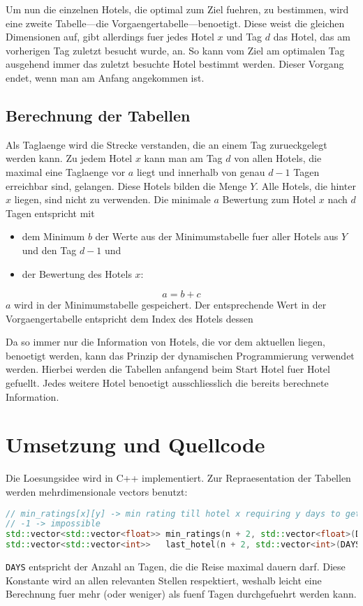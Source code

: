\documentclass[a4paper,10pt,ngerman]{scrartcl}
\begin{document}
Um nun die einzelnen Hotels, die optimal zum Ziel fuehren, zu bestimmen, wird eine zweite Tabelle---die Vorgaengertabelle---benoetigt.
Diese weist die gleichen Dimensionen auf, gibt allerdings fuer jedes Hotel $x$ und Tag $d$ das Hotel, das am vorherigen Tag zuletzt besucht wurde, an.
So kann vom Ziel am optimalen Tag ausgehend immer das zuletzt besuchte Hotel bestimmt werden.
Dieser Vorgang endet, wenn man am Anfang angekommen ist.

\subsection{Berechnung der Tabellen}
Als Taglaenge wird die Strecke verstanden, die an einem Tag zurueckgelegt werden kann.
Zu jedem Hotel $x$ kann man am Tag $d$ von allen Hotels, die maximal eine Taglaenge vor $a$ liegt und innerhalb von genau $d-1$ Tagen erreichbar sind, gelangen.
Diese Hotels bilden die Menge $Y$.
Alle Hotels, die hinter $x$ liegen, sind nicht zu verwenden.
Die minimale $a$ Bewertung zum Hotel $x$ nach $d$ Tagen entspricht mit
\begin{itemize}
    \item dem Minimum $b$ der Werte aus der Minimumstabelle fuer aller Hotels aus $Y$ und den Tag $d-1$ und
    \item der Bewertung des Hotels $x$:
\end{itemize}
\begin{equation*}
    a = b + c
\end{equation*}
$a$ wird in der Minimumstabelle gespeichert.
Der entsprechende Wert in der Vorgaengertabelle entspricht dem Index des Hotels dessen

Da so immer nur die Information von Hotels, die vor dem aktuellen liegen, benoetigt werden, kann das Prinzip der dynamischen Programmierung verwendet werden.
Hierbei werden die Tabellen anfangend beim \glqq{}Start\grqq{} Hotel fuer Hotel gefuellt.
Jedes weitere Hotel benoetigt ausschliesslich die bereits berechnete Information.

\section{Umsetzung und Quellcode}
Die Loesungsidee wird in C++ implementiert.
Zur Repraesentation der Tabellen werden mehrdimensionale vectors benutzt:
\begin{lstlisting}[language=C++]
// min_ratings[x][y] -> min rating till hotel x requiring y days to get to
// -1 -> impossible
std::vector<std::vector<float>> min_ratings(n + 2, std::vector<float>(DAYS + 1, -1));
std::vector<std::vector<int>>   last_hotel(n + 2, std::vector<int>(DAYS + 1, -1));
\end{lstlisting}
\lstinline{DAYS} entspricht der Anzahl an Tagen, die die Reise maximal dauern darf.
Diese Konstante wird an allen relevanten Stellen respektiert, weshalb leicht eine Berechnung fuer mehr (oder weniger) als fuenf Tagen durchgefuehrt werden kann.
\end{document}
